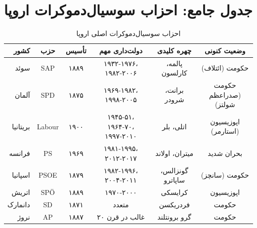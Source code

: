 \section{جدول جامع: احزاب سوسیال‌دموکرات اروپا}

\begin{landscape}
\begin{table}[htbp]
\centering
\caption{احزاب سوسیال‌دموکرات اصلی اروپا}
\label{tab:socdem-parties}
\small
\begin{tabular}{r|c|c|c|c|c}
\toprule
\textbf{کشور} & \textbf{حزب} & \textbf{تأسیس} & \textbf{دولت‌داری مهم} & \textbf{چهره کلیدی} & \textbf{وضعیت کنونی} \\
\midrule
سوئد & SAP & ۱۸۸۹ & ۱۹۳۲-۱۹۷۶، ۱۹۸۲-۲۰۰۶ & پالمه، کارلسون & حکومت (ائتلاف) \\
آلمان & SPD & ۱۸۷۵ & ۱۹۶۹-۱۹۸۲، ۱۹۹۸-۲۰۰۵ & برانت، شرودر & حکومت (صدراعظم شولتز) \\
بریتانیا & Labour & ۱۹۰۰ & ۱۹۴۵-۵۱، ۱۹۶۴-۷۰، ۱۹۹۷-۲۰۱۰ & اتلی، بلر & اپوزیسیون (استارمر) \\
فرانسه & PS & ۱۹۶۹ & ۱۹۸۱-۱۹۹۵، ۲۰۱۲-۲۰۱۷ & میتران، اولاند & بحران شدید \\
اسپانیا & PSOE & ۱۸۷۹ & ۱۹۸۲-۱۹۹۶، ۲۰۰۴-۲۰۱۱ & گونزالس، ساپاترو & حکومت (سانچز) \\
اتریش & SPÖ & ۱۸۸۹ & ۱۹۷۰-۲۰۰۰ & کرایسکی & اپوزیسیون \\
دانمارک & SD & ۱۸۷۱ & متعدد & فردریکسن & حکومت \\
نروژ & AP & ۱۸۸۷ & غالب در قرن ۲۰ & گرو برونتلند & حکومت \\
\bottomrule
\end{tabular}
\end{table}
\end{landscape}


\newpage

